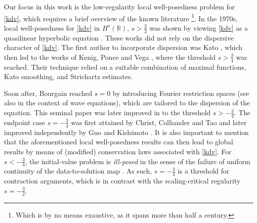 \documentclass[%
11pt,  reqno]{amsart}
\newcommand{\5}{\textup{V}}
\newcommand{\jp}{\color{orange}}
\theoremstyle{remark}
\newcommand{\R}{\mathbb{R}}
\numberwithin{equation}{section}
\numberwithin{theorem}{section}
\begin{document}
\medskip

Our focus in this work is the low-regularity local well-posedness problem for \eqref{kdv}, which requires a brief overview of the known literature {\footnote{Which is by no means exaustive, as it spans more than half a century.}}. In the 1970s, local well-posedness for \eqref{kdv} in $H^s(\R)$, $s>\frac32$ was shown by viewing \eqref{kdv} as a quasilinear hyperbolic equation \cite{BonaSmith, Kato_kdv, SautTemam, TsutsumiMukasa}. These works did not rely on the dispersive character of \eqref{kdv}. The first {author} to incorporate dispersion was Kato \cite{Kato_kdv_disp}, which then led to the works of Kenig, Ponce and Vega \cite{KPV91, KPV_gkdv}, where {the threshold $s>\frac34$ was reached}. Their technique relied on a suitable combination of maximal functions, Kato smoothing, and Strichartz estimates. 

\medskip


Soon after, Bourgain \cite{bourg2} reached $s=0$ by introducing Fourier restriction spaces (see also  \cite{KlainermanMachedon} in the context of wave equations), which are tailored to the dispersion of the equation. This seminal paper was later improved in \cite{kpv_bilin} to the threshold $s>-\frac34$. The endpoint case $s=-\frac34$ was first attained by Christ, Colliander and Tao \cite{CCT_ill} and later improved independently by Guo \cite{Guo_gwp} and Kishimoto \cite{Kishimoto_lwp_crit}. { It is also important to mention that the} aforementioned local well-posedness results can then lead to global results \cite{bourg2, CKSTT_sharp_kdv, Guo_gwp} by means of (modified) conservation laws associated with \eqref{kdv}. For $s<-\frac34$, the initial-value problem is \emph{ill-posed} in the sense of the failure of uniform continuity of the data-to-solution map \cite{KPV_ill}. As such, $s=-\frac34$ is a threshold for contraction arguments, which is in contrast with the scaling-critical regularity $s=-\frac32$. 
	
\end{document}
